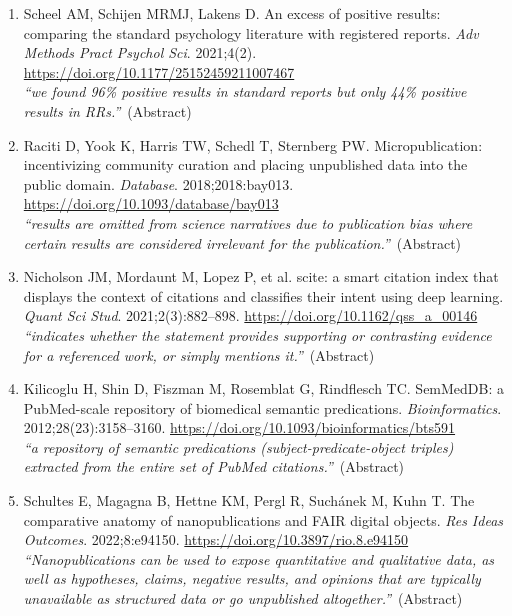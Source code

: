 \documentclass[12pt]{article}
\begin{document}
{\begin{enumerate}[leftmargin=1.8em,itemsep=5pt,topsep=0pt,label=\arabic*.]
\item \hypertarget{ref-scheel2021}{}Scheel AM, Schijen MRMJ, Lakens D. An excess of positive results: comparing the standard psychology literature with registered reports. \textit{Adv Methods Pract Psychol Sci}. 2021;4(2). \url{https://doi.org/10.1177/25152459211007467}\\[1pt]{\color{quote}\itshape ``we found 96\% positive results in standard reports but only 44\% positive results in RRs.''}~{\color{quote}\footnotesize(Abstract)}
\item \hypertarget{ref-raciti2018}{}Raciti D, Yook K, Harris TW, Schedl T, Sternberg PW. Micropublication: incentivizing community curation and placing unpublished data into the public domain. \textit{Database}. 2018;2018:bay013. \url{https://doi.org/10.1093/database/bay013}\\[1pt]{\color{quote}\itshape ``results are omitted from science narratives due to publication bias where certain results are considered irrelevant for the publication.''}~{\color{quote}\footnotesize(Abstract)}
\item \hypertarget{ref-nicholson2021}{}Nicholson JM, Mordaunt M, Lopez P, et al. scite: a smart citation index that displays the context of citations and classifies their intent using deep learning. \textit{Quant Sci Stud}. 2021;2(3):882--898. \url{https://doi.org/10.1162/qss_a_00146}\\[1pt]{\color{quote}\itshape ``indicates whether the statement provides supporting or contrasting evidence for a referenced work, or simply mentions it.''}~{\color{quote}\footnotesize(Abstract)}
\item \hypertarget{ref-kilicoglu2012}{}Kilicoglu H, Shin D, Fiszman M, Rosemblat G, Rindflesch TC. SemMedDB: a PubMed-scale repository of biomedical semantic predications. \textit{Bioinformatics}. 2012;28(23):3158--3160. \url{https://doi.org/10.1093/bioinformatics/bts591}\\[1pt]{\color{quote}\itshape ``a repository of semantic predications (subject-predicate-object triples) extracted from the entire set of PubMed citations.''}~{\color{quote}\footnotesize(Abstract)}
\item \hypertarget{ref-schultes2022}{}Schultes E, Magagna B, Hettne KM, Pergl R, Suchánek M, Kuhn T. The comparative anatomy of nanopublications and FAIR digital objects. \textit{Res Ideas Outcomes}. 2022;8:e94150. \url{https://doi.org/10.3897/rio.8.e94150}\\[1pt]{\color{quote}\itshape ``Nanopublications can be used to expose quantitative and qualitative data, as well as hypotheses, claims, negative results, and opinions that are typically unavailable as structured data or go unpublished altogether.''}~{\color{quote}\footnotesize(Abstract)}

\end{enumerate}}
\end{document}
